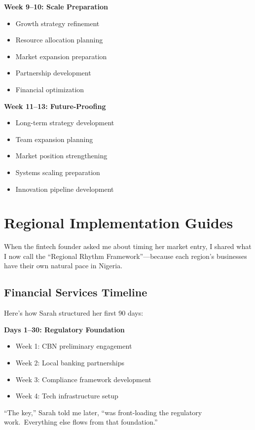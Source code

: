 \textbf{Week 9--10: Scale Preparation}
\begin{itemize}
    \item Growth strategy refinement
    \item Resource allocation planning
    \item Market expansion preparation
    \item Partnership development
    \item Financial optimization
\end{itemize}

\textbf{Week 11--13: Future-Proofing}
\begin{itemize}
    \item Long-term strategy development
    \item Team expansion planning
    \item Market position strengthening
    \item Systems scaling preparation
    \item Innovation pipeline development
\end{itemize}


\section{Regional Implementation Guides}\label{sec:regional-implementation}

When the fintech founder asked me about timing her market entry, I shared what I now call the ``Regional Rhythm Framework''—because each region's businesses have their own natural pace in Nigeria.

\subsection{Financial Services Timeline}\label{subsec:uk-timeline}
Here's how Sarah structured her first 90 days:

\textbf{Days 1–30: Regulatory Foundation}
\begin{itemize}
    \item Week 1: CBN preliminary engagement
    \item Week 2: Local banking partnerships
    \item Week 3: Compliance framework development
    \item Week 4: Tech infrastructure setup
\end{itemize}

``The key,'' Sarah told me later, ``was front-loading the regulatory work.\ Everything else flows from that foundation.''

